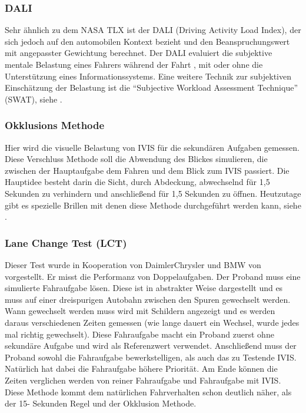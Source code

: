 \subsubsection{DALI}
Sehr ähnlich zu dem NASA TLX ist der DALI (Driving Activity Load Index), der sich jedoch auf den automobilen Kontext bezieht und den Beanspruchungswert mit angepasster Gewichtung berechnet. 
Der DALI evaluiert die subjektive mentale Belastung eines Fahrers während der Fahrt \citep{pauzie2008method}, mit oder ohne die Unterstützung eines Informationssystems. 
Eine weitere Technik zur subjektiven Einschätzung der Belastung ist die "`Subjective Workload Assessment Technique"' (SWAT), siehe \citep{reid1982subjective}.
\subsubsection{Okklusions Methode}
Hier wird die visuelle Belastung von IVIS für die sekundären Aufgaben gemessen. 
Diese Verschluss Methode soll die Abwendung des Blickes simulieren, die zwischen der Hauptaufgabe dem Fahren und dem Blick zum IVIS passiert. 
Die Hauptidee besteht darin die Sicht, durch Abdeckung, abwechselnd für 1,5 Sekunden zu verhindern und anschließend für 1,5 Sekunden zu öffnen. 
Heutzutage gibt es spezielle Brillen mit denen diese Methode durchgeführt werden kann, siehe \citep{pettitt2006assessment}.

\subsubsection{Lane Change Test (LCT)}
Dieser Test wurde in Kooperation von DaimlerChrysler und BMW von \citet{mattes2003lane} vorgestellt. 
Er misst die Performanz von Doppelaufgaben. 
Der Proband muss eine simulierte Fahraufgabe lösen. 
Diese ist in abstrakter Weise dargestellt und es muss auf einer dreispurigen Autobahn zwischen den Spuren gewechselt werden. 
Wann gewechselt werden muss wird mit Schildern angezeigt und es werden daraus verschiedenen Zeiten gemessen (wie lange dauert ein Wechsel, wurde jedes mal richtig gewechselt). 
Diese Fahraufgabe macht ein Proband zuerst ohne sekundäre Aufgabe und wird als Referenzwert verwendet. 
Anschließend muss der Proband sowohl die Fahraufgabe bewerkstelligen, als auch das zu Testende IVIS. 
Natürlich hat dabei die Fahraufgabe höhere Priorität.  
Am Ende können die Zeiten verglichen werden von reiner Fahraufgabe und Fahraufgabe mit IVIS. 
Diese Methode kommt dem natürlichen Fahrverhalten schon deutlich näher, als der 15- Sekunden Regel und der Okklusion Methode.

